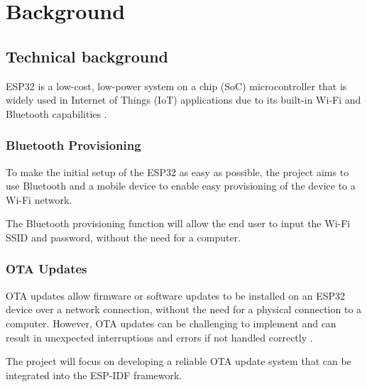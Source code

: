 \section{Background}
\label{sec:background}

\subsection{Technical background}
\label{sec:technical}
ESP32 is a low-cost, low-power system on a chip (SoC) microcontroller that is widely used in Internet of Things (IoT) applications due to its built-in Wi-Fi and Bluetooth capabilities \cite{espressif:popularity} \cite{espressif:esp32_datasheet}.

\subsubsection{Bluetooth Provisioning}
\label{subsec:bluetooth}
To make the initial setup of the ESP32 as easy as possible, the project aims to use Bluetooth and a mobile device to enable easy provisioning of the device to a Wi-Fi network.

The Bluetooth provisioning function will allow the end user to input the Wi-Fi SSID and password, without the need for a computer.

\subsubsection{OTA Updates}
\label{subsec:ota}
OTA updates allow firmware or software updates to be installed on an ESP32 device over a network connection, without the need for a physical connection to a computer. However, OTA updates can be challenging to implement and can result in unexpected interruptions and errors if not handled correctly \cite{Arakadakis:2021}.

The project will focus on developing a reliable OTA update system that can be integrated into the ESP-IDF framework.

